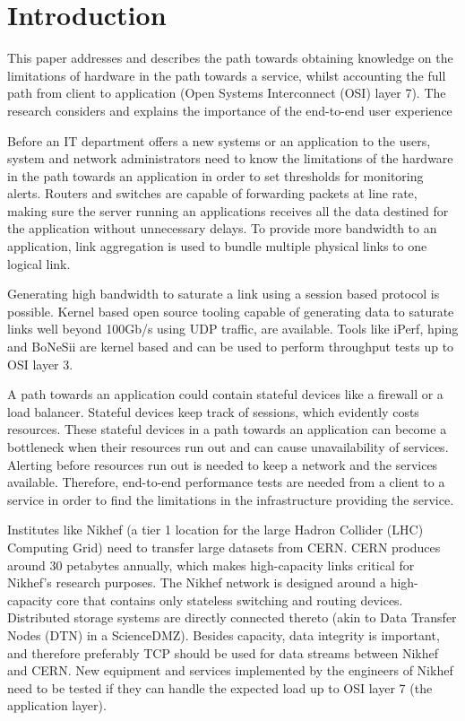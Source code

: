 \chapter{Introduction}\label{ch:intro}

This paper addresses and describes the path towards obtaining knowledge on the limitations of hardware in the path towards a service, whilst accounting the full path from client to application (Open Systems Interconnect (OSI) layer 7). 
The research considers and explains the importance of the end-to-end user experience

Before an IT department offers a new systems or an application to the users, system and network administrators need to know the limitations of the hardware in the path towards an application in order to set thresholds for monitoring alerts. 
Routers and switches are capable of forwarding packets at line rate, making sure the server running an applications receives all the data destined for the application without unnecessary delays. 
To provide more bandwidth to an application, link aggregation is used to bundle multiple physical links to one logical link.

Generating high bandwidth to saturate a link using a session based protocol is possible. 
Kernel based open source tooling capable of generating data to saturate links well beyond 100Gb/s using UDP traffic, are available.  
Tools like iPerf\cite{iperf}, hping\cite{hping} and BoNeSi\cite{bonesi}i are kernel based and can be used to perform throughput tests up to OSI layer 3.  

A path towards an application could contain stateful devices like a firewall or a load balancer. 
Stateful devices keep track of sessions, which evidently costs resources. 
These stateful devices in a path towards an application can become a bottleneck when their resources run out and can cause unavailability of services.
Alerting before resources run out is needed to keep a network and the services available.  
Therefore, end-to-end performance tests are needed from a client to a service in order to find the limitations in the infrastructure providing the service.

Institutes like Nikhef (a tier 1 location for the large Hadron Collider (LHC) Computing Grid) need to transfer large datasets from CERN. 
CERN produces around 30 petabytes annually\cite{cerndata}, which makes high-capacity links critical for Nikhef's research purposes.
The Nikhef network is designed around a high-capacity core that contains only stateless switching and routing devices. 
Distributed storage systems are directly connected thereto (akin to Data Transfer Nodes (DTN) in a ScienceDMZ\cite{sciencedmz}).
Besides capacity, data integrity is important, and therefore preferably TCP should be used for data streams between Nikhef and CERN. 
New equipment and services implemented by the engineers of Nikhef need to be tested if they can handle the expected load up to OSI layer 7 (the application layer).

